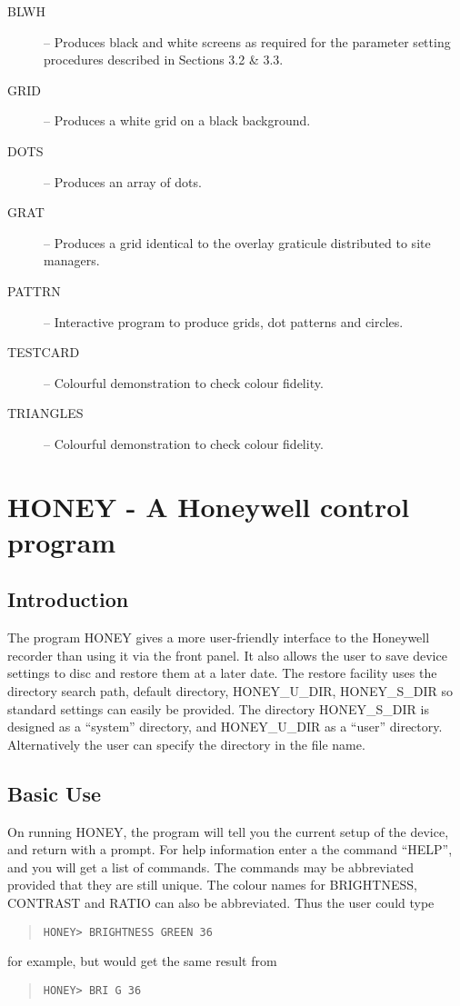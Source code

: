 \begin{description}
\item [BLWH] -- Produces black and white screens as required for
the parameter setting procedures described in Sections 3.2 \&
3.3.
\item[GRID] -- Produces a white grid on a black background.
\item[DOTS] -- Produces an array of dots.
\item[GRAT] -- Produces a grid identical to the overlay graticule
distributed to site managers.
\item[PATTRN] -- Interactive program to produce grids, dot patterns and
circles.
\item[TESTCARD] -- Colourful demonstration to check colour fidelity.
\item[TRIANGLES] -- Colourful demonstration to check colour fidelity.
\end{description} 

\appendix

\section{HONEY - A Honeywell control program}

\subsection{Introduction}

The program HONEY gives a more user-friendly interface to the Honeywell
recorder than using it via the front panel. It also allows the user to
save device settings to disc and restore them at a later date. The
restore facility uses the directory search path, default directory,
HONEY\_U\_DIR, HONEY\_S\_DIR so standard settings can easily be
provided. The directory HONEY\_S\_DIR is designed as a ``system''
directory, and HONEY\_U\_DIR as a ``user'' directory. Alternatively
the user can specify the directory in the file name.

\subsection{Basic Use}

On running HONEY, the program will
tell you the current setup of the device, and return with a prompt.
For help information enter a the command ``HELP'', and you will get
a list of commands. The commands may be abbreviated provided that they
are still unique. The colour names for BRIGHTNESS, CONTRAST and RATIO
can also be abbreviated. Thus the user could type
\begin{quote}
\begin{verbatim}
HONEY> BRIGHTNESS GREEN 36
\end{verbatim}
\end{quote}
for example, but would get the same result from
\begin{quote}
\begin{verbatim}
HONEY> BRI G 36
\end{verbatim}
\end{quote}

